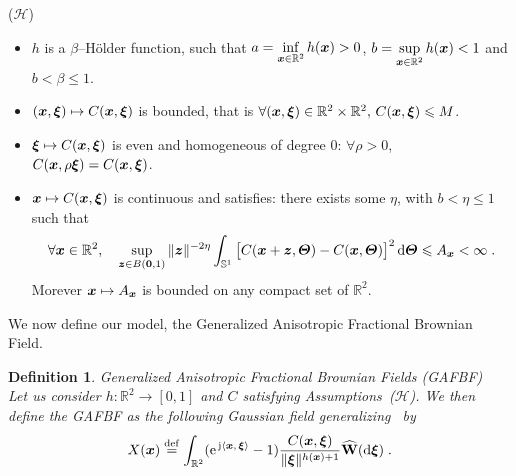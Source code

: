 \documentclass{elsarticle}
\newtheorem{definition}{Definition}
\begin{document}
($\mathcal{H}$)
\,
\begin{itemize}
\item $h$ is a $\beta$--H\"older function, such that  $\displaystyle a=\inf_{\bm{x}\in \mathbb{R}^2}h(\bm{x}) > 0$, $\displaystyle b=\sup_{\bm{x}\in \mathbb{R}^2}h(\bm{x})<1$ and $b<\beta\leq 1$.
\item $(\bm{x},\bm{\xi})\mapsto C(\bm{x},\bm{\xi})$ is bounded, that is $\forall (\bm{x},\bm{\xi})\in \mathbb{R}^2\times \mathbb{R}^2,\, C(\bm{x},\bm{\xi})\leqslant M$.
\item $\bm{\xi}\mapsto C(\bm{x},\bm{\xi})$ is even and homogeneous of degree 0: $\forall \rho>0$, $C(\bm{x},\rho\bm{\xi})=C(\bm{x},\bm{\xi})$.
\item $\bm{x}\mapsto C(\bm{x},\bm{\xi})$ is continuous and satisfies: there exists some $\eta$, with $b<\eta\leq 1$ such that
\begin{equation}
\label{eq:homogene}
 \forall \vect{x}\in \mathbb{R}^2,\quad \sup_{\vect{z}\in B(\vect{0},1)} \|\vect{z}\|^{-2\eta}\int_{\mathbb{S}^1}\left[C(\vect{x}+\vect{z},\vect{\Theta})-C(\vect{x},\vect{\Theta})\right]^2\dif \vect{\Theta}\leq A_{\vect{x}}<\infty \;.
\end{equation}
Morever $\bm{x}\mapsto A_{\bm{x}}$ is bounded on any compact set of $\mathbb{R}^2$.
\end{itemize}

\noindent We now define our model, the Generalized Anisotropic Fractional Brownian Field.
\begin{definition}{Generalized Anisotropic Fractional Brownian Fields (GAFBF)}\\
Let us consider $h:\mathbb{R}^2\to [0,1]$ and $C$ satisfying Assumptions~($\mathcal{H}$). We then define the GAFBF as the following Gaussian field generalizing~\cite{PCCP14,PCCP15} by
\begin{equation}\label{eq:gafbf}
X(\bm{x})\overset{\mathrm{def}}{=}\int_{\mathbb{R}^2}(\mathrm{e}^{\, \mathrm{j} \left \langle \bm{x},\, \bm{\xi}\right \rangle}-1)\frac{C(\bm{x},\bm{\xi})}{\lVert \bm{\xi} \rVert^{h(\bm{x})+1}}\mathbf{\widehat{W}}(\mathop{}\mathopen{}\mathrm{d} \bm{\xi})\;.
\end{equation}
\end{definition}
\end{document}
